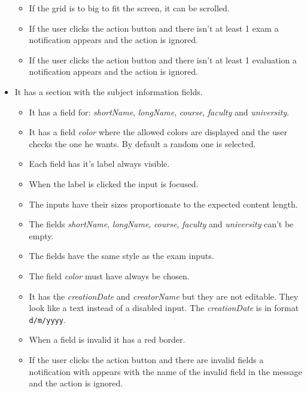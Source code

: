 \begin{itemize}[leftmargin=2cm]
\begin{itemize}[leftmargin=2cm]
        \item[\nextTask{}\label{req:x}] If the grid is to big to fit the screen, it can be scrolled.
        \item[\nextTask{}\label{req:x}] If the user clicks the action button and there isn't at least 1 exam a notification appears and the action is ignored.
        \item[\nextTask{}\label{req:x}] If the user clicks the action button and there isn't at least 1 evaluation a notification appears and the action is ignored.
    \end{itemize}
    \item[\nextTask{}\label{req:x}] It has a section with the subject information fields.
    \begin{itemize}[leftmargin=2cm]
        \item[\nextTask{}\label{req:x}] It has a field for: \textit{shortName}, \textit{longName}, \textit{course}, \textit{faculty} and \textit{university}.
        \item[\nextTask{}\label{req:x}] It has a field \textit{color} where the allowed colors are displayed and the user checks the one he wants. By default a random one is selected.
        \item[\nextTask{}\label{req:x}] Each field has it's label always visible.
        \item[\nextTask{}\label{req:x}] When the label is clicked the input is focused.
        \item[\nextTask{}\label{req:x}] The inputs have their sizes proportionate to the expected content length.
        \item[\nextTask{}\label{req:x}] The fields \textit{shortName}, \textit{longName}, \textit{course}, \textit{faculty} and \textit{university} can't be empty.
        \item[\nextTask{}\label{req:x}] The fields have the same style as the exam inputs.
        \item[\nextTask{}\label{req:x}] The field \textit{color} must have always be chosen.
        \item[\nextTask{}\label{req:x}] It has the \textit{creationDate} and \textit{creatorName} but they are not editable. They look like a text instead of a disabled input. The \textit{creationDate} is in format \texttt{d/m/yyyy}.
        \item[\nextTask{}\label{req:x}] When a field is invalid it has a red border.
        \item[\nextTask{}\label{req:x}] If the user clicks the action button and there are invalid fields a notification with appears with the name of the invalid field in the message and the action is ignored.

\end{itemize}
\end{itemize}
